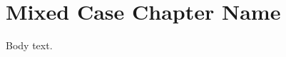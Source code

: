 \documentclass[a4paper,12pt]{report}
\begin{document}
\chapter{Mixed Case Chapter Name}
Body text.
\end{document}
